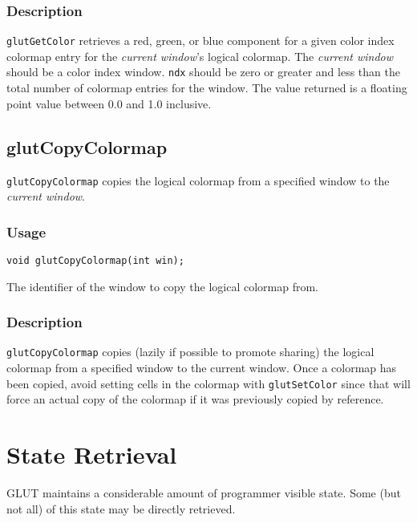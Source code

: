 \subsubsection*{Description}

{\tt glutGetColor} retrieves a red, green, or blue component for a given
color index colormap entry for the {\em current window}'s logical colormap.
The {\em current window} should be a color index window.
{\tt ndx} should be zero or greater and less than the total number of colormap entries
for the window.
The value returned is a floating point value between 0.0 and 1.0 inclusive.

\subsection{glutCopyColormap}

{\tt glutCopyColormap} copies the logical
colormap from a specified window to the {\em current window}.

\subsubsection*{Usage}
\begin{verbatim}
void glutCopyColormap(int win);
\end{verbatim}
\begin{description}
\itemsep 0in
\item[\tt win]
The identifier of the window to copy the logical colormap from.
\end{description}

\subsubsection*{Description}

{\tt glutCopyColormap} copies (lazily if possible to promote sharing) the logical
colormap from a specified window to the current window.  Once a colormap has been
copied, avoid setting cells in the colormap with {\tt glutSetColor} since that
will force an actual copy of the colormap if it was previously copied by reference.

\section{State Retrieval}

GLUT maintains a considerable amount of programmer visible state.
Some (but not all) of this state may be directly retrieved.

